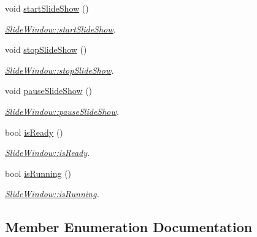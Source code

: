 \begin{DoxyCompactItemize}
\mbox{\label{classSlideWindow_a9d3d44873c65713a074ba695b47980bc}} 
void \mbox{\hyperlink{classSlideWindow_a9d3d44873c65713a074ba695b47980bc}{start\+Slide\+Show}} ()
\begin{DoxyCompactList}\small\item\em \mbox{\hyperlink{classSlideWindow_a9d3d44873c65713a074ba695b47980bc}{Slide\+Window\+::start\+Slide\+Show}}. \end{DoxyCompactList}\item 
\mbox{\label{classSlideWindow_a89de9d9f9a95ce0a35f74fe4753271c4}} 
void \mbox{\hyperlink{classSlideWindow_a89de9d9f9a95ce0a35f74fe4753271c4}{stop\+Slide\+Show}} ()
\begin{DoxyCompactList}\small\item\em \mbox{\hyperlink{classSlideWindow_a89de9d9f9a95ce0a35f74fe4753271c4}{Slide\+Window\+::stop\+Slide\+Show}}. \end{DoxyCompactList}\item 
\mbox{\label{classSlideWindow_afba2bd4fa49e7f3314ed1c8f82eaf381}} 
void \mbox{\hyperlink{classSlideWindow_afba2bd4fa49e7f3314ed1c8f82eaf381}{pause\+Slide\+Show}} ()
\begin{DoxyCompactList}\small\item\em \mbox{\hyperlink{classSlideWindow_afba2bd4fa49e7f3314ed1c8f82eaf381}{Slide\+Window\+::pause\+Slide\+Show}}. \end{DoxyCompactList}\item 
bool \mbox{\hyperlink{classSlideWindow_aeb8eb94e4d5e470ddd23129a337defed}{is\+Ready}} ()
\begin{DoxyCompactList}\small\item\em \mbox{\hyperlink{classSlideWindow_aeb8eb94e4d5e470ddd23129a337defed}{Slide\+Window\+::is\+Ready}}. \end{DoxyCompactList}\item 
bool \mbox{\hyperlink{classSlideWindow_aabcc67b2a5443bc5bfe27cbc348fc094}{is\+Running}} ()
\begin{DoxyCompactList}\small\item\em \mbox{\hyperlink{classSlideWindow_aabcc67b2a5443bc5bfe27cbc348fc094}{Slide\+Window\+::is\+Running}}. \end{DoxyCompactList}\end{DoxyCompactItemize}


\subsection{Member Enumeration Documentation}
\mbox{\label{classSlideWindow_aa352c11c452cb40358b09ecb2a98cb1a}} 

